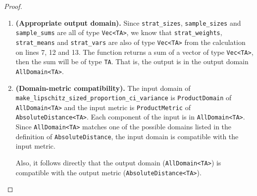 \documentclass[11pt,a4paper]{article}
\begin{document}
\begin{proof}
\hfill
\begin{enumerate}


    \item \textbf{(Appropriate output domain).}
    Since \texttt{strat\_sizes}, \texttt{sample\_sizes} and \texttt{sample\_sums} are all of type \texttt{Vec<TA>},
    we know that \texttt{strat\_weights}, \texttt{strat\_means} and \texttt{strat\_vars} are also of type \texttt{Vec<TA>} from the calculation on lines 7, 12 and 13. The function returns a sum of a vector of type \texttt{Vec<TA>},  then the sum will be of type \texttt{TA}. That is, the output is in the output domain \texttt{AllDomain<TA>}.

    
    
    \smallskip
    \item \textbf{(Domain-metric compatibility).}
    The input domain of  \\
    \texttt{make\_lipschitz\_sized\_proportion\_ci\_variance} is \texttt{ProductDomain} of \texttt{AllDomain<TA>} and the input metric is \texttt{ProductMetric} of \texttt{AbsoluteDistance<TA>}.
    Each component of the input is in \texttt{AllDomain<TA>}.
    Since \texttt{AllDomain<TA>} matches one of the possible domains listed in the definition of \texttt{AbsoluteDistance}, 
    the input domain is compatible with the input metric.
    
    Also, it follows directly that the output domain (\texttt{AllDomain<TA>}) is compatible with the output metric (\texttt{AbsoluteDistance<TA>}). 
    
   
    

\end{enumerate}
\end{proof}
\end{document}
